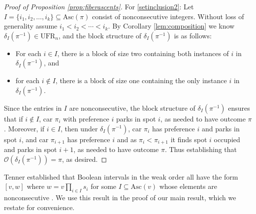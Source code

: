 \documentclass[11pt,reqno]{amsart}
\newcommand{\Asc}{\mathrm{Asc}}
\newcommand{\Out}{\mathcal{O}}
\newcommand{\ufr}[1]{\mathrm{UFR}_{#1}}
\begin{document}
\begin{proof}[Proof of Proposition \ref{prop:fiberascents}]
\noindent For \eqref{setinclusion2}:
Let $I=\{i_1,i_2,\ldots,i_k\}\subseteq \Asc(\pi)$ consist of nonconsecutive integers. 
Without loss of generality assume $i_1<i_2<\cdots<i_k$. 
By Corollary \ref{lem:composition} we know $\delta_I(\pi^{-1})\in \ufr{n}$,
and the block structure of $\delta_I(\pi^{-1})$ is as follows:
\begin{itemize}[leftmargin=.2in]
    \item For each $i\in I$, there is a block of size two containing both instances of $i$ in $\delta_I(\pi^{-1})$, and 
    \item for each  $i\notin I$, there is a block of size one containing the only instance $i$ in $\delta_I(\pi^{-1})$.
\end{itemize}
Since the entries in $I$ are nonconsecutive, the block structure of $\delta_I(\pi^{-1})$ ensures that 
if $i\notin I$, car $\pi_i$ with preference $i$ parks in spot $i$, as needed to have outcome $\pi$. Moreover, if $i\in I$, then under $\delta_{I}(\pi^{-1})$, car $\pi_i$ has preference $i$ and parks in spot $i$, and car $\pi_{i+1}$ has preference $i$ and as $\pi_i<\pi_{i+1}$ it finds spot $i$ occupied and parks in spot $i+1$, as needed to have outcome $\pi$. Thus establishing that $\Out(\delta_I(\pi^{-1}))=\pi$, as desired.
\end{proof}

Tenner established that Boolean intervals in the weak order all have the form $[v,w]$ where $w= v \prod_{i\in I} s_i$ for some $I\subseteq \Asc(v) $ whose elements are nonconsecutive \cite[Corollary 4.4]{tenner2022interval}. 
We use this result in the proof of our main result, which we restate for convenience.

\nkThm*
\end{document}
